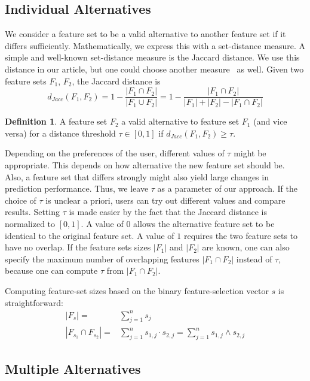 \documentclass{article}
\theoremstyle{definition}
\newtheorem{definition}{Definition}
\begin{document}
\subsection{Individual Alternatives}

We consider a feature set to be a valid alternative to another feature set if it differs sufficiently.
Mathematically, we express this with a set-distance measure.
A simple and well-known set-distance measure is the Jaccard distance.
We use this distance in our article, but one could choose another measure~\cite{egghe2009new} as well.
Given two feature sets $F_1$, $F_2$, the Jaccard distance is
%
\begin{equation}
	d_{Jacc}(F_1,F_2) = 1 - \frac{|F_1 \cap F_2|}{|F_1 \cup F_2|} = 1 - \frac{|F_1 \cap F_2|}{|F_1| + |F_2| - |F_1 \cap F_2|}
\end{equation}
%
\begin{definition}
	A feature set $F_2$ a valid alternative to feature set $F_1$ (and vice versa) for a distance threshold $\tau \in [0,1]$ if $d_{Jacc}(F_1,F_2) \geq \tau$.
\end{definition}
%
Depending on the preferences of the user, different values of $\tau$ might be appropriate.
This depends on how alternative the new feature set should be.
Also, a feature set that differs strongly might also yield large changes in prediction performance.
Thus, we leave $\tau$ as a parameter of our approach.
If the choice of $\tau$ is unclear a priori, users can try out different values and compare results.
Setting $\tau$ is made easier by the fact that the Jaccard distance is normalized to $[0,1]$.
A value of $0$ allows the alternative feature set to be identical to the original feature set.
A value of $1$ requires the two feature sets to have no overlap.
If the feature sets sizes $|F_1|$ and $|F_2|$ are known, one can also specify the maximum number of overlapping features $|F_1 \cap F_2|$ instead of $\tau$, because one can compute $\tau$ from $|F_1 \cap F_2|$.

Computing feature-set sizes based on the binary feature-selection vector $s$ is straightforward:
%
\begin{align}
	|F_s| =& \sum_{j=1}^n s_j\\
	|F_{s_1} \cap F_{s_2}| =& \sum_{j=1}^n s_{1,j} \cdot s_{2,j} = \sum_{j=1}^n s_{1,j} \land s_{2,j}
\end{align}
%
\subsection{Multiple Alternatives}
\end{document}
